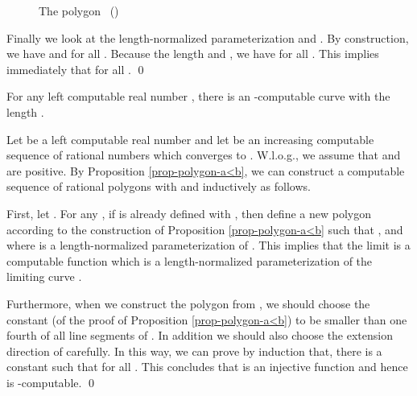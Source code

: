 \documentclass{LMCS}
\theoremstyle{plain}
\begin{document}
\begin{figure}[h]
\begin{center}
\end{center}
\caption{The polygon \ ()}\label{fig-q}
\end{figure}

\noindent Finally we look at the length-normalized parameterization  and . By construction, we have  and  for all . Because the length  and , we have  for all . This implies immediately that  for all .
\qed

\begin{thm}\label{thm-N-noncomp-length}
For any left computable real number , there is an -computable curve with the length .
\end{thm}
\proof Let  be a left computable real number and let  be an increasing computable sequence of rational numbers which converges to . W.l.o.g., we assume that  and  are positive. By Proposition \ref{prop-polygon-a<b}, we can construct a computable sequence  of rational polygons with  and   inductively as follows.

First, let . For any , if  is already defined with , then define a new polygon  according to the construction of Proposition \ref{prop-polygon-a<b} such that ,  and  where  is a length-normalized parameterization of . This implies that the limit  is a computable function which is a length-normalized parameterization of the limiting curve .

Furthermore, when we construct the polygon  from , we should choose the constant  (of the proof of Proposition \ref{prop-polygon-a<b}) to be smaller than one fourth of all line segments of . In addition we should also choose the extension direction of  carefully. In this way, we can prove by induction that, there is a constant  such that  for all . This concludes that  is an injective function and hence  is -computable.
\qed
\end{document}
